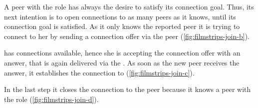 A peer with the role \peer has always the desire to satisfy its connection goal.
Thus, its next intention is to open connections to as many peers as it knows, until its connection goal is satisfied. As it only knows the reported peer \alice it is trying to connect to her by sending a connection offer via the \signal peer (\vref{fig:filmstrips-join-b}).

\alice has connections available, hence she is accepting the connection offer with an answer, that is again delivered via the \signal. As soon as the new peer receives the answer, it establishes the connection to \alice (\vref{fig:filmstrips-join-c}).

In the last step it closes the connection to the \signal peer because it knows a peer with the role \router (\vref{fig:filmstrips-join-d}).

